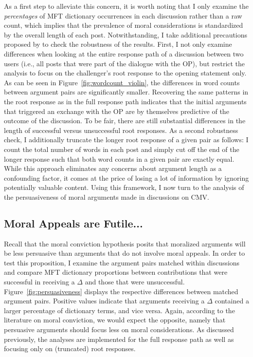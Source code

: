 As a first step to alleviate this concern, it is worth noting that I only examine the \textit{percentages} of MFT dictionary occurrences in each discussion rather than a raw count, which implies that the prevalence of moral considerations is standardized by the overall length of each post. Notwithstanding, I take additional precautions proposed by \citet{tan2016winning} to check the robustness of the results. First, I not only examine differences when looking at the entire response path of a discussion between two users (i.e., all posts that were part of the dialogue with the OP), but restrict the analysis to focus on the challenger's root response to the opening statement only. As can be seen in Figure~\ref{fig:wordcount_violin}, the differences in word counts between argument pairs are significantly smaller. Recovering the same patterns in the root response as in the full response path indicates that the initial arguments that triggered an exchange with the OP are by themselves predictive of the outcome of the discussion. To be fair, there are still substantial differences in the length of successful versus unsuccessful root responses. As a second robustness check, I additionally truncate the longer root response of a given pair as follows: I count the total number of words in each post and simply cut off the end of the longer response such that both word counts in a given pair are exactly equal. While this approach eliminates any concerns about argument length as a confounding factor, it comes at the price of losing a lot of information by ignoring potentially valuable content. Using this framework, I now turn to the analysis of the persuasiveness of moral arguments made in discussions on CMV.


\subsection{Moral Appeals are Futile...}

Recall that the moral conviction hypothesis posits that moralized arguments will be less persuasive than arguments that do not involve moral appeals. In order to test this proposition, I examine the argument pairs matched within discussions and compare MFT dictionary proportions between contributions that were successful in receiving a $\Delta$ and those that were unsuccessful. Figure~\ref{fig:persuasiveness} displays the respective differences between matched argument pairs. Positive values indicate that arguments receiving a $\Delta$ contained a larger percentage of dictionary terms, and vice versa. Again, according to the literature on moral conviction, we would expect the opposite, namely that persuasive arguments should focus less on moral considerations. As discussed previously, the analyses are implemented for the full response path as well as focusing only on (truncated) root responses.

